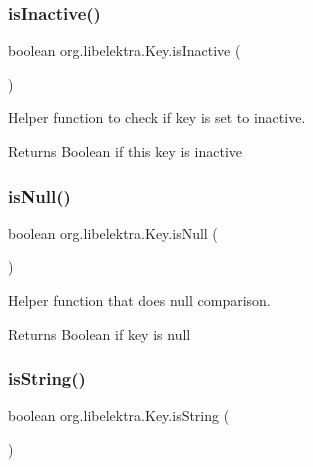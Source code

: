 \subsubsection{\texorpdfstring{is\+Inactive()}{isInactive()}}
{\footnotesize\ttfamily boolean org.\+libelektra.\+Key.\+is\+Inactive (\begin{DoxyParamCaption}{ }\end{DoxyParamCaption})\hspace{0.3cm}{\ttfamily [inline]}}



Helper function to check if key is set to inactive. 

\begin{DoxyReturn}{Returns}
Boolean if this key is inactive 
\end{DoxyReturn}
\mbox{\label{classorg_1_1libelektra_1_1Key_adfcebdd407d050b0626a8f2cfec00e8b}} 
\subsubsection{\texorpdfstring{is\+Null()}{isNull()}}
{\footnotesize\ttfamily boolean org.\+libelektra.\+Key.\+is\+Null (\begin{DoxyParamCaption}{ }\end{DoxyParamCaption})\hspace{0.3cm}{\ttfamily [inline]}}



Helper function that does null comparison. 

\begin{DoxyReturn}{Returns}
Boolean if key is null 
\end{DoxyReturn}
\mbox{\label{classorg_1_1libelektra_1_1Key_acb0e1141fa920b798a66a2076cd61562}} 
\subsubsection{\texorpdfstring{is\+String()}{isString()}}
{\footnotesize\ttfamily boolean org.\+libelektra.\+Key.\+is\+String (\begin{DoxyParamCaption}{ }\end{DoxyParamCaption})\hspace{0.3cm}{\ttfamily [inline]}}



